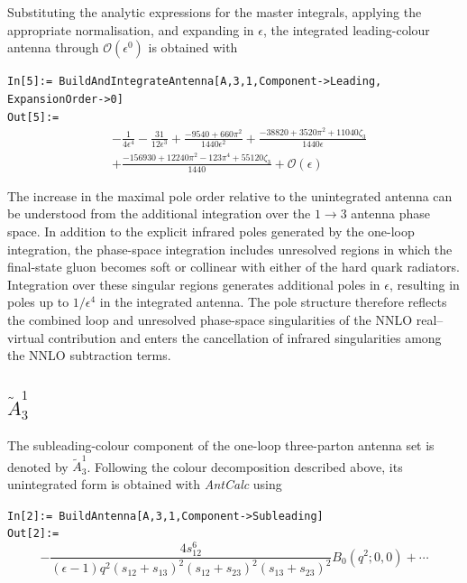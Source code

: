 Substituting the analytic expressions for the master integrals, applying the
appropriate normalisation, and expanding in $\epsilon$, the integrated leading-colour
antenna through $\mathcal O(\epsilon^0)$ is obtained with

\begin{mdframed}[backgroundcolor=gray!10, linewidth=0pt]
\texttt{In[5]:= BuildAndIntegrateAntenna[A,3,1,Component->Leading,\\ExpansionOrder->0]}\\
\hfill
\texttt{Out[5]:=}
    \begin{equation*}
        \begin{split}
            &-\frac1{4\epsilon^4}-\frac{31}{12\epsilon^3}+\frac{-9540+660\pi^2}{1440\epsilon^2}+\frac{-38820+3520\pi^2+11040\zeta_3}{1440\epsilon}\\
            &+\frac{-156930+12240\pi^2-123\pi^4+55120\zeta_3}{1440}+\mathcal O(\epsilon)
        \end{split}
    \end{equation*}
\end{mdframed}

The increase in the maximal pole order relative to the unintegrated antenna can be
understood from the additional integration over the $1\to3$ antenna phase space. In
addition to the explicit infrared poles generated by the one-loop integration, the
phase-space integration includes unresolved regions in which the final-state gluon
becomes soft or collinear with either of the hard quark radiators. Integration over
these singular regions generates additional poles in $\epsilon$, resulting in poles up
to $1/\epsilon^4$ in the integrated antenna. The pole structure therefore reflects the
combined loop and unresolved phase-space singularities of the NNLO real--virtual
contribution and enters the cancellation of infrared singularities among the NNLO
subtraction terms.

\subsection{$\tilde A_3^1$}\label{subsec:A31sub}

The subleading-colour component of the one-loop three-parton antenna set is denoted
by $\widetilde A_3^1$. Following the colour decomposition described above, its
unintegrated form is obtained with \textit{AntCalc} using

\begin{mdframed}[backgroundcolor=gray!10, linewidth=0pt]
\texttt{In[2]:= BuildAntenna[A,3,1,Component->Subleading]}\\
\hfill
\texttt{Out[2]:=}
    \begin{equation*}
        -\frac{4s_{12}^6}{(\epsilon-1)q^2(s_{12}+s_{13})^2(s_{12}+s_{23})^2(s_{13}+s_{23})^2}B_0\!\left(q^2;0,0\right)+\cdots
    \end{equation*}
\end{mdframed}

